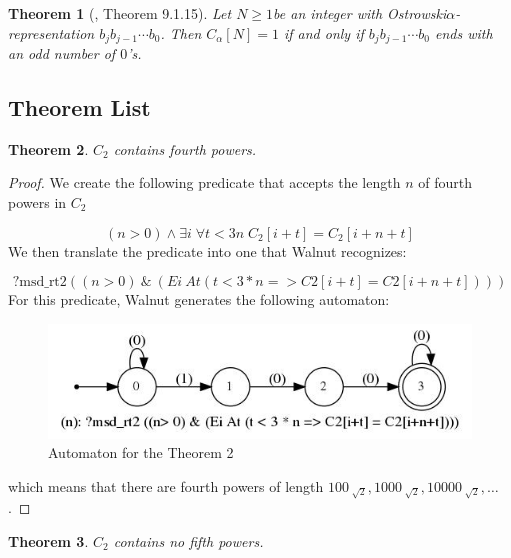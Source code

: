 \documentclass[a4paper]{article}
\newtheorem{theorem}{Theorem}
\begin{document}
\begin{theorem}[\cite{sturmianword}, Theorem 9.1.15] Let $N\ge1$be an integer with Ostrowski$\alpha$-representation $b_jb_{j−1}\cdots b_0$. Then $C_\alpha[N] = 1$ if and only if $b_jb_{j−1}\cdots b_0$ ends with an odd number of $0$’s.
\end{theorem}


\subsection{Theorem List}

\begin{theorem} \textbf{$C_2$} \textit{contains fourth powers.}
\end{theorem}

\begin{proof}
We create the following predicate that accepts the length $n$ of fourth powers in $C_2$

$$(n > 0) \land \exists i \; \forall t<3n \;C_2[i+t] = C_2[i+n+t]$$
We then translate the predicate into one that Walnut recognizes:

$$ ? \text{msd}\_\text{rt2} ((n>0)~\&~(Ei~At (t<3 \ast n => C2[i+t] = C2[i+n+t])))$$
For this predicate, Walnut generates the following automaton:

\begin{figure}[h]
\centering
\includegraphics[width=0.7\columnwidth]{theorem5_gv.jpg}
    \caption{Automaton for the Theorem 2}
    \label{fig:Theorem}
\end{figure}
which means that there are fourth powers of length $100_{\sqrt[~]{2}},1000_{\sqrt[~]{2}},10000_{\sqrt[~]{2}},\dots$.
\end{proof}

\begin{theorem} \textbf{$C_2$} \textit{contains no fifth powers.}
\end{theorem}
\end{document}
